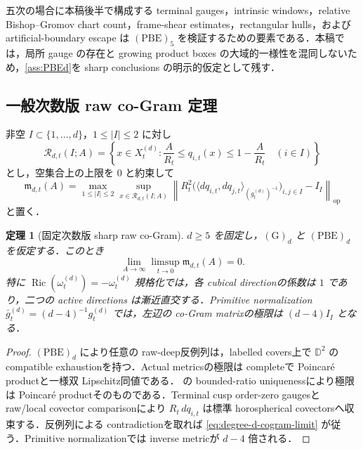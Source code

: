 \documentclass[a4paper,11pt]{ltjsarticle}
\numberwithin{equation}{section}
\theoremstyle{plain}
\newtheorem{theorem}{定理}[section]
\theoremstyle{definition}
\theoremstyle{remark}
\newcommand{\Ric}{\operatorname{Ric}}\newcommand{\tr}{\operatorname{tr}}\newcommand{\osc}{\operatorname{osc}}\newcommand{\vol}{\operatorname{Vol}}
\begin{document}
\begin{remark}\label{rem:PBE-status}
五次の場合に本稿後半で構成する terminal gauges，intrinsic windows，relative Bishop--Gromov chart count，frame-shear estimates，rectangular hulls，および artificial-boundary escape は $\mathrm{(PBE)}_5$ を検証するための要素である．本稿では，局所 gauge の存在と growing product boxes の大域的一様性を混同しないため，\cref{ass:PBEd}を sharp conclusions の明示的仮定として残す．
\end{remark}

\subsection{一般次数版 raw co-Gram 定理}

非空 $I\subset\{1,\ldots,d\}$，$1\le|I|\le2$ に対し
\begin{equation}\label{eq:degree-d-raw-region}
 \mathcal R_{d,t}(I;A)
 =\left\{x\in X_t^{(d)}:
 \frac A{R_t}\le q_{i,t}(x)\le1-\frac A{R_t}
 \quad(i\in I)\right\}
\end{equation}
とし，空集合上の上限を $0$ と約束して
\begin{equation}\label{eq:degree-d-cogram-modulus}
 \mathfrak m_{d,t}(A)
 =\max_{1\le|I|\le2}\sup_{x\in\mathcal R_{d,t}(I;A)}
 \left\|
 R_t^2
 \bigl(\langle dq_{i,t},dq_{j,t}\rangle_{(g_t^{(d)})^{-1}}\bigr)_{i,j\in I}
 -I_I
 \right\|_{\mathrm{op}}
\end{equation}
と置く．

\begin{theorem}[固定次数版 sharp raw co-Gram]\label{thm:degree-d-cogram}
$d\ge5$ を固定し，$\mathrm{(G)}_d$ と $\mathrm{(PBE)}_d$ を仮定する．このとき
\begin{equation}\label{eq:degree-d-cogram-limit}
 \lim_{A\to\infty}\limsup_{t\to0}\mathfrak m_{d,t}(A)=0.
\end{equation}
特に $\Ric(\omega_t^{(d)})=-\omega_t^{(d)}$ 規格化では，各 cubical directionの係数は $1$ であり，二つの active directions は漸近直交する．Primitive normalization
$\bar g_t^{(d)}=(d-4)^{-1}g_t^{(d)}$ では，左辺の co-Gram matrixの極限は $(d-4)I_I$ となる．
\end{theorem}

\begin{proof}
$\mathrm{(PBE)}_d$ により任意の raw-deep反例列は，labelled covers上で $\mathbb D^2$ の compatible exhaustionを持つ．Actual metricsの極限は completeで Poincaré productと一様双 Lipschitz同値である． の bounded-ratio uniquenessにより極限は Poincaré productそのものである．Terminal cusp order-zero gaugesと raw/local covector comparisonにより
$R_t\,dq_{i,t}$ は標準 horospherical covectorsへ収束する．反例列による contradictionを取れば
\eqref{eq:degree-d-cogram-limit} が従う．Primitive normalizationでは inverse metricが $d-4$ 倍される．
\end{proof}
\end{document}
